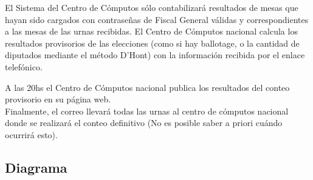 El Sistema del Centro de Cómputos sólo contabilizará resultados de mesas que hayan sido cargados con contraseñas de Fiscal General válidas y correspondientes a las mesas de las urnas recibidas.
El Centro de Cómputos nacional calcula los resultados provisorios de las elecciones (como si hay ballotage, o la cantidad de diputados mediante el método D’Hont) con la información recibida por el enlace telefónico.

A las 20hs el Centro de Cómputos nacional publica los resultados del conteo provisorio en su página web.\\

Finalmente, el correo llevará todas las urnas al centro de cómputos nacional donde se realizará el conteo definitivo (No es posible saber a priori cuándo ocurrirá esto).

\newpage
\subsection{Diagrama}

